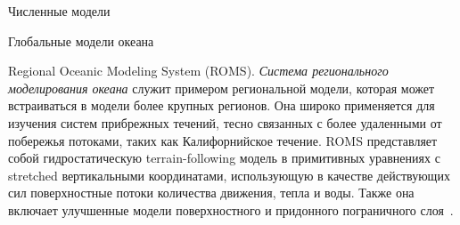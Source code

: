 \begin{chapter}{Численные модели}
\begin{section}{Глобальные модели океана}
\begin{paragraph}{Regional Oceanic Modeling System (ROMS).}
\emph{Система регионального моделирования океана} служит примером региональной 
модели, которая может встраиваться в модели более крупных регионов. 
Она широко применяется для изучения систем
прибрежных течений, тесно связанных с более удаленными от побережья потоками,
таких как Калифорнийское течение. ROMS представляет собой гидростатическую
terrain-following модель в примитивных уравнениях с stretched вертикальными
координатами, использующую в качестве действующих сил поверхностные потоки
количества движения, тепла и воды. Также она включает улучшенные модели
поверхностного и придонного пограничного слоя~\cite{Shchepetkin:2004}.
% 
\end{paragraph}


\end{section}
\end{chapter}
